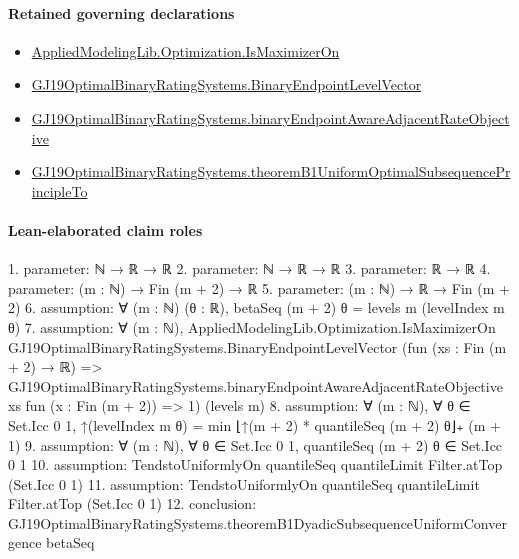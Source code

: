 \documentclass[10pt]{article}
\begin{document}
\paragraph{Retained governing declarations}
\begin{itemize}\raggedright
\item \hyperlink{governing-declaration-67616b2feb727132}{Applied\allowbreak{}Modeling\allowbreak{}Lib.\allowbreak{}Optimization.\allowbreak{}Is\allowbreak{}Maximizer\allowbreak{}On}
\item \hyperlink{governing-declaration-aa797f827cdcda67}{GJ19\allowbreak{}Optimal\allowbreak{}Binary\allowbreak{}Rating\allowbreak{}Systems.\allowbreak{}Binary\allowbreak{}Endpoint\allowbreak{}Level\allowbreak{}Vector}
\item \hyperlink{governing-declaration-90a6fa979204b5b7}{GJ19\allowbreak{}Optimal\allowbreak{}Binary\allowbreak{}Rating\allowbreak{}Systems.\allowbreak{}binary\allowbreak{}Endpoint\allowbreak{}Aware\allowbreak{}Adjacent\allowbreak{}Rate\allowbreak{}Objective}
\item \hyperlink{governing-declaration-6b826cd2c3c6fd93}{GJ19\allowbreak{}Optimal\allowbreak{}Binary\allowbreak{}Rating\allowbreak{}Systems.\allowbreak{}theorem\allowbreak{}B1\allowbreak{}Uniform\allowbreak{}Optimal\allowbreak{}Subsequence\allowbreak{}Principle\allowbreak{}To}
\end{itemize}
\paragraph{Lean-elaborated claim roles}\begin{ReviewVerbatim}
1. parameter: ℕ → ℝ → ℝ
2. parameter: ℕ → ℝ → ℝ
3. parameter: ℝ → ℝ
4. parameter: (m : ℕ) → Fin (m + 2) → ℝ
5. parameter: (m : ℕ) → ℝ → Fin (m + 2)
6. assumption: ∀ (m : ℕ) (θ : ℝ), betaSeq (m + 2) θ = levels m (levelIndex m θ)
7. assumption: ∀ (m : ℕ),
  AppliedModelingLib.Optimization.IsMaximizerOn GJ19OptimalBinaryRatingSystems.BinaryEndpointLevelVector
    (fun (xs : Fin (m + 2) → ℝ) =>
      GJ19OptimalBinaryRatingSystems.binaryEndpointAwareAdjacentRateObjective xs fun (x : Fin (m + 2)) => 1)
    (levels m)
8. assumption: ∀ (m : ℕ), ∀ θ ∈ Set.Icc 0 1, ↑(levelIndex m θ) = min ⌊↑(m + 2) * quantileSeq (m + 2) θ⌋₊ (m + 1)
9. assumption: ∀ (m : ℕ), ∀ θ ∈ Set.Icc 0 1, quantileSeq (m + 2) θ ∈ Set.Icc 0 1
10. assumption: TendstoUniformlyOn quantileSeq quantileLimit Filter.atTop (Set.Icc 0 1)
11. assumption: TendstoUniformlyOn quantileSeq quantileLimit Filter.atTop (Set.Icc 0 1)
12. conclusion: GJ19OptimalBinaryRatingSystems.theoremB1DyadicSubsequenceUniformConvergence betaSeq
\end{ReviewVerbatim}
\end{document}
